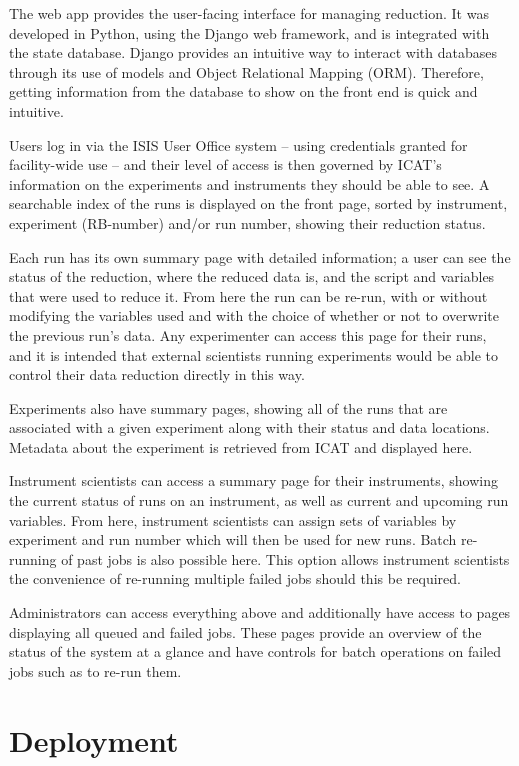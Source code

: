 \documentclass[twocolumn]{article}
\begin{document}
The web app provides the user-facing interface for managing reduction.
It was developed in Python, using the Django web framework, and is
integrated with the state database. Django provides an intuitive way to
interact with databases through its use of models and Object Relational Mapping (ORM).
Therefore, getting information from the database to show on the front end is 
quick and intuitive. 

Users log in via the ISIS User Office system -- using credentials 
granted for facility-wide use -- and their level of access is then 
governed by ICAT's \cite{icat} information on the experiments and instruments they 
should be able to see. A searchable index of the runs is displayed on the front page, sorted
by instrument, experiment (RB-number) and/or run number, showing their reduction
status.

Each run has its own summary page with detailed information; a user can
see the status of the reduction, where the reduced data is, and the
script and variables that were used to reduce it. From here the run can
be re-run, with or without modifying the variables used and with the choice
of whether or not to overwrite the previous run's data. Any
experimenter can access this page for their runs, and it is intended that
external scientists running experiments would be able to control their data
reduction directly in this way.

Experiments also have summary pages, showing all of the runs that are
associated with a given experiment along with their status and data
locations. Metadata about the experiment is retrieved from ICAT and
displayed here.

Instrument scientists can access a summary page for their instruments,
showing the current status of runs on an instrument, as well as current
and upcoming run variables. From here, instrument scientists can assign
sets of variables by experiment and run number which will then be used
for new runs. Batch re-running of past jobs is also possible here. 
This option allows instrument scientists the convenience of re-running multiple 
failed jobs should this be required. 

Administrators can access everything above and additionally have access
to pages displaying all queued and failed jobs. These pages provide an
overview of the status of the system at a glance and have controls for
batch operations on failed jobs such as to re-run them.

\section{Deployment}\label{deployment}
\end{document}
